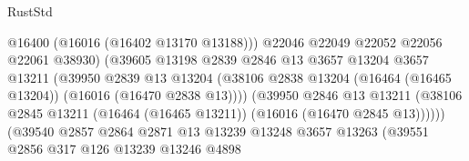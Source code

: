 \begin{lexlean}{RustStd}
\begin{coremodule}
                                            @16400
                                            (@16016 (@16402 @13170 @13188)))
                                          @22046
                                          @22049
                                          @22052
                                          @22056
                                          @22061
                                          @38930)
                                        (@39605
                                          @13198
                                          @2839
                                          @2846
                                          @13
                                          @3657
                                          @13204
                                          @3657
                                          @13211
                                          (@39950
                                            @2839
                                            @13
                                            @13204
                                            (@38106
                                              @2838
                                              @13204
                                              (@16464 (@16465 @13204))
                                              (@16016 (@16470 @2838 @13))))
                                          (@39950
                                            @2846
                                            @13
                                            @13211
                                            (@38106
                                              @2845
                                              @13211
                                              (@16464 (@16465 @13211))
                                              (@16016 (@16470 @2845 @13))))))
                                      (@39540
                                        @2857
                                        @2864
                                        @2871
                                        @13
                                        @13239
                                        @13248
                                        @3657
                                        @13263
                                        (@39551
                                          @2856
                                          @317
                                          @126
                                          @13239
                                          @13246
                                          @4898

\end{coremodule}
\end{lexlean}
